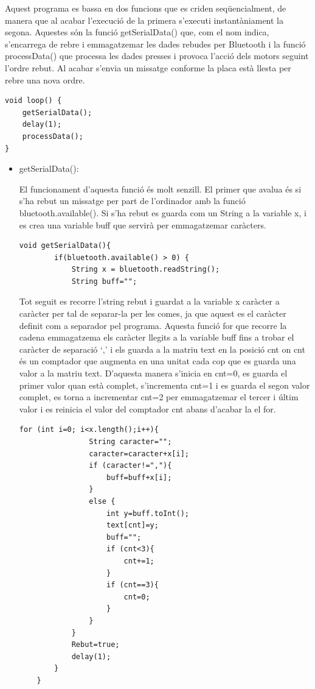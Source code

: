 Aquest programa es bassa en dos funcions que es criden seqüencialment, de manera que al acabar l’execució de la primera s’executi instantàniament la segona. Aquestes són la funció getSerialData() que, com el nom indica, s’encarrega de rebre i emmagatzemar les dades rebudes per Bluetooth i la funció processData() que processa les dades presses i provoca l’acció dels motors seguint l’ordre rebut. Al acabar s’envia un missatge conforme la placa està llesta per rebre una nova ordre. 
\begin{lstlisting}[style=Arduino]
void loop() {
	getSerialData();
	delay(1);
	processData();
}
\end{lstlisting}
\begin{itemize}
	\item getSerialData():
	
	El funcionament d’aquesta funció és molt senzill. El primer que avalua és si s’ha rebut un missatge per part de l’ordinador amb la funció bluetooth.available(). Si s’ha rebut es guarda com un String a la variable x, i es crea una variable buff que servirà per emmagatzemar caràcters. 
	
	\begin{lstlisting}[style=Arduino]
	void getSerialData(){
		if(bluetooth.available() > 0) {
			String x = bluetooth.readString();
			String buff="";
	\end{lstlisting}
	
	Tot seguit es recorre l’string rebut i guardat a la variable x caràcter a caràcter per tal de separar-la per les comes, ja que aquest es el caràcter definit com a separador pel programa. Aquesta funció for que recorre la cadena emmagatzema els caràcter llegits a la variable buff fins a trobar el caràcter de separació ‘,’ i els guarda a la matriu text en la posició cnt on cnt és un comptador que augmenta en una unitat cada cop que es guarda una valor a la matriu text. D’aquesta manera s’inicia en cnt=0, es guarda el primer valor quan està complet, s’incrementa cnt=1 i es guarda el segon valor complet, es torna a incrementar cnt=2 per emmagatzemar el tercer i últim valor i es reinicia el valor del comptador cnt abans d’acabar la el for. 
	
	\begin{lstlisting}[style=Arduino]
			for (int i=0; i<x.length();i++){
				String caracter="";
				caracter=caracter+x[i];
				if (caracter!=","){
					buff=buff+x[i];
				}
				else {
					int y=buff.toInt();
					text[cnt]=y;
					buff="";
					if (cnt<3){
						cnt+=1;
					}
					if (cnt==3){
						cnt=0;
					}
				}
			}
			Rebut=true;
			delay(1);    
		}
	}
	\end{lstlisting}
	

\end{itemize}
